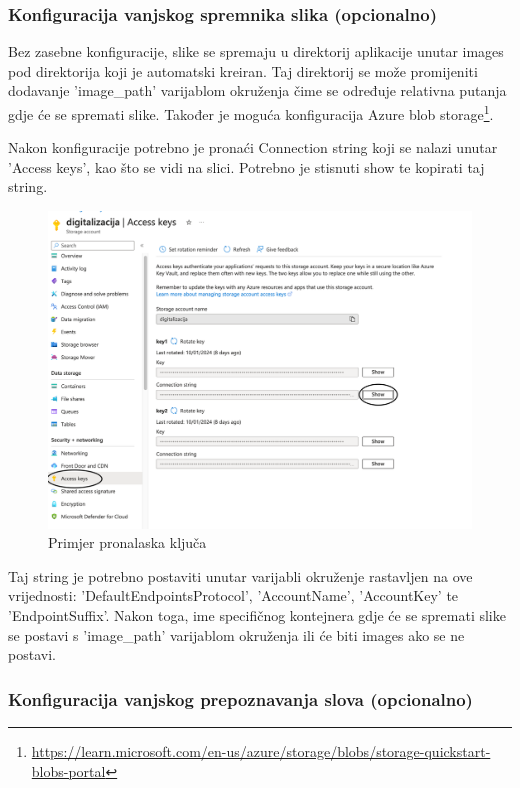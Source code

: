 			
			\subsubsection{Konfiguracija vanjskog spremnika slika (opcionalno)}
			
			{Bez zasebne konfiguracije, slike se spremaju u direktorij aplikacije unutar images pod direktorija koji je automatski kreiran. Taj direktorij se može promijeniti dodavanje 'image\_path' varijablom okruženja čime se određuje relativna putanja gdje će se spremati slike. Također je moguća konfiguracija Azure blob storage\footnote{\url{https://learn.microsoft.com/en-us/azure/storage/blobs/storage-quickstart-blobs-portal}}.}
			
			{Nakon konfiguracije potrebno je pronaći Connection string koji se nalazi unutar 'Access keys', kao što se vidi na slici. Potrebno je stisnuti show te kopirati taj string.}
			
			\begin{figure}[H]
				\includegraphics[width=\textwidth]{slike/accessKey.png}
				\caption{Primjer pronalaska ključa}
				\label{fig:accessKey}
			\end{figure}
			
			{Taj string je potrebno postaviti unutar varijabli okruženje rastavljen na ove vrijednosti: 'DefaultEndpointsProtocol', 'AccountName', 'AccountKey' te 'EndpointSuffix'. Nakon toga, ime specifičnog kontejnera gdje će se spremati slike se postavi s 'image\_path' varijablom okruženja ili će biti images ako se ne postavi.}
			
			\subsubsection{Konfiguracija vanjskog prepoznavanja slova (opcionalno)}
			
